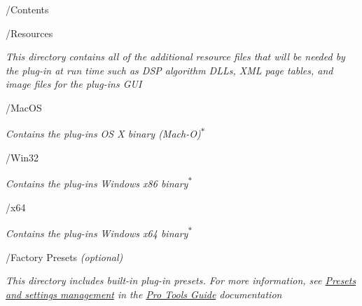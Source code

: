 \begin{DoxyItemize}
\item /\+Contents 
\begin{DoxyItemize}
\item /\+Resources 
\begin{DoxyItemize}
\item {\itshape This directory contains all of the additional resource files that will be needed by the plug-\/in at run time such as D\+S\+P algorithm D\+L\+Ls, X\+M\+L page tables, and image files for the plug-\/in\textquotesingle{}s G\+U\+I}  
\end{DoxyItemize}
\end{DoxyItemize}
\begin{DoxyItemize}
\item /\+Mac\+O\+S 
\begin{DoxyItemize}
\item {\itshape Contains the plug-\/in\textquotesingle{}s O\+S X binary (Mach-\/\+O)\textsuperscript{$\ast$}}  
\end{DoxyItemize}
\end{DoxyItemize}
\begin{DoxyItemize}
\item /\+Win32 
\begin{DoxyItemize}
\item {\itshape Contains the plug-\/in\textquotesingle{}s Windows x86 binary\textsuperscript{$\ast$}}  
\end{DoxyItemize}
\end{DoxyItemize}
\begin{DoxyItemize}
\item /x64 
\begin{DoxyItemize}
\item {\itshape Contains the plug-\/in\textquotesingle{}s Windows x64 binary\textsuperscript{$\ast$}}  
\end{DoxyItemize}
\end{DoxyItemize}
\begin{DoxyItemize}
\item /\+Factory Presets {\itshape (optional) } 
\begin{DoxyItemize}
\item {\itshape This directory includes built-\/in plug-\/in presets. For more information, see \hyperlink{a00360_subsection__presets_and_settings_management}{Presets and settings management} in the \hyperlink{a00360}{Pro Tools Guide} documentation}  
\end{DoxyItemize}
\end{DoxyItemize}

\end{DoxyItemize}
